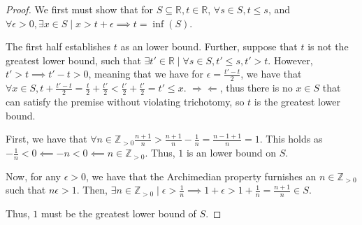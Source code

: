 \documentclass[12pt,letterpaper]{article}
\theoremstyle{definition}
\newcommand{\contra}{\Rightarrow\!\Leftarrow}
\newcommand{\R}{\mathbb{R}}
\newcommand{\Zg}{\mathbb{Z}_{>0}}
\begin{document}
\begin{proof}
  We first must show that for $S \subseteq \R, t \in \R$, $\forall s \in S, t
  \leq s$, and $\forall \epsilon > 0, \exists x \in S \mid x > t + \epsilon \implies t = \inf(S)$.

  The first half establishes $t$ as an lower bound. Further,
  suppose that $t$ is not the greatest lower bound, such that $\exists t' \in \R \mid
  \forall s \in S, t' \leq s, t' > t$. However, $t' > t \implies t' - t > 0$,
  meaning that we have for $\epsilon = \frac{t' - t}{2}$, we have that $\forall x \in
  S, t + \frac{t' - t}{2} = \frac{t}{2} + \frac{t'}{2} < \frac{t'}{2} +
  \frac{t'}{2} = t' \leq x$. $\contra$, thus there is no $x \in S$ that can satisfy
  the premise without violating trichotomy, so $t$ is the greatest lower bound.

  First, we have that $\forall n \in \Zg \frac{n+1}{n} > \frac{n+1}{n} - \frac{1}{n} =
  \frac{n-1+1}{n} = 1$. This holds as $-\frac{1}{n} < 0 \impliedby -n < 0
  \impliedby n \in \Zg$. Thus, $1$ is an lower bound on $S$.

  Now, for any $\epsilon > 0$, we have that the Archimedian property furnishes an
  $n \in \Zg$ such that $n\epsilon > 1$. Then, $\exists n \in \Zg \mid \epsilon >
  \frac{1}{n} \implies 1 + \epsilon > 1 + \frac{1}{n} = \frac{n+1}{n} \in S$. 

  Thus, $1$ must be the greatest lower bound of $S$.
\end{proof}
\end{document}
